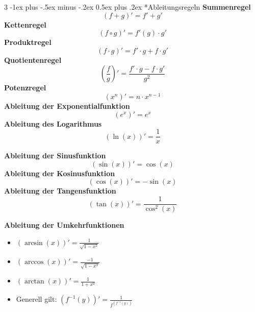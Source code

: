\documentclass[10pt,landscape,a4paper]{article}
\makeatletter
\renewcommand{\section}{\@startsection{section}{1}{0mm}%
                                {-1ex plus -.5ex minus -.2ex}%
                                {0.5ex plus .2ex}%
                                {\normalfont\large\bfseries}}
\makeatother
\begin{document}
\begin{multicols*}{3}
\section*{Ableitungsregeln}
\textbf{Summenregel}
\begin{equation*}
    (f+g)' = f' + g'
\end{equation*}
\textbf{Kettenregel}
\begin{equation*}
    (f \circ g)' = f'(g) \cdot g'
\end{equation*}
\textbf{Produktregel}
\begin{equation*}
    (f \cdot g)' = f' \cdot g + f \cdot g'
\end{equation*}
\textbf{Quotientenregel}
\begin{equation*}
    \left(\frac{f}{g}\right)' = \frac{f' \cdot g - f \cdot g'}{g^2}
\end{equation*}
\textbf{Potenzregel}
\begin{equation*}
    (x^n)' = n \cdot x^{n-1}
\end{equation*}
\textbf{Ableitung der Exponentialfunktion}
\begin{equation*}
    (e^x)' = e^x
\end{equation*}
\textbf{Ableitung des Logarithmus}
\begin{equation*}
    (\ln(x))' = \frac{1}{x}
\end{equation*}

\textbf{Ableitung der Sinusfunktion}
\begin{equation*}
    (\sin(x))' = \cos(x)
\end{equation*}
\textbf{Ableitung der Kosinusfunktion}
\begin{equation*}
    (\cos(x))' = -\sin(x)
\end{equation*}
\textbf{Ableitung der Tangensfunktion}
\begin{equation*}
    (\tan(x))' = \frac{1}{\cos^2(x)}
\end{equation*}

\textbf{Ableitung der Umkehrfunktionen}
\begin{itemize}
    \item $(\arcsin(x))' = \frac{1}{\sqrt{1-x^2}}$
    \item $(\arccos(x))' = \frac{-1}{\sqrt{1-x^2}}$
    \item $(\arctan(x))' = \frac{1}{1+x^2}$
    \item Generell gilt: $(f^{-1}(y))' = \frac{1}{f^(f^{-1}(y))}$
\end{itemize}



\end{multicols*}
\end{document}
